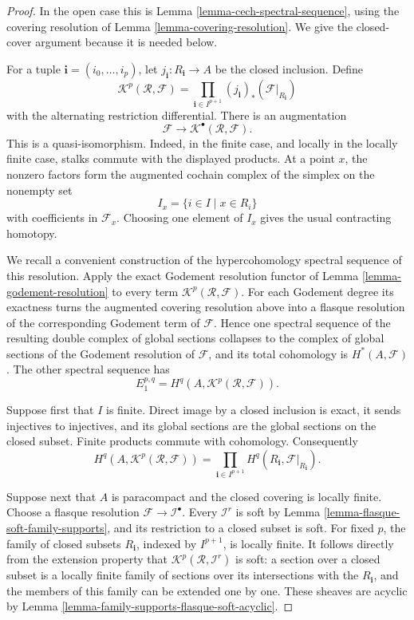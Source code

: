 \begin{proof}
In the open case this is Lemma \ref{lemma-cech-spectral-sequence}, using the
covering resolution of Lemma \ref{lemma-covering-resolution}. We give the
closed-cover argument because it is needed below.

For a tuple $\mathbf i=(i_0,\ldots,i_p)$, let
$j_{\mathbf i}:R_{\mathbf i}\to A$ be the closed inclusion. Define
$$
\mathcal K^p(\mathcal R,\mathcal F)=
\prod_{\mathbf i\in I^{p+1}}
(j_{\mathbf i})_*(\mathcal F|_{R_{\mathbf i}})
$$
with the alternating restriction differential. There is an augmentation
$$
\mathcal F\longrightarrow
\mathcal K^\bullet(\mathcal R,\mathcal F).
$$
This is a quasi-isomorphism. Indeed, in the finite case, and locally in the
locally finite case, stalks commute with the displayed products. At a point
$x$, the nonzero factors form the augmented cochain complex of the simplex
on the nonempty set
$$
I_x=\{i\in I\mid x\in R_i\}
$$
with coefficients in $\mathcal F_x$. Choosing one element of $I_x$ gives
the usual contracting homotopy.

We recall a convenient construction of the hypercohomology spectral
sequence of this resolution. Apply the exact Godement resolution functor of
Lemma \ref{lemma-godement-resolution} to every term
$\mathcal K^p(\mathcal R,\mathcal F)$. For each Godement degree its
exactness turns the augmented covering resolution above into a flasque
resolution of the corresponding Godement term of $\mathcal F$. Hence one
spectral sequence of the resulting double complex of global sections
collapses to the complex of global sections of the Godement resolution of
$\mathcal F$, and its total cohomology is $H^*(A,\mathcal F)$. The other
spectral sequence has
$$
E_1^{p,q}=H^q(A,\mathcal K^p(\mathcal R,\mathcal F)).
$$

Suppose first that $I$ is finite. Direct image by a closed inclusion is
exact, it sends injectives to injectives, and its global sections are the
global sections on the closed subset. Finite products commute with
cohomology. Consequently
$$
H^q(A,\mathcal K^p(\mathcal R,\mathcal F))=
\prod_{\mathbf i\in I^{p+1}}
H^q(R_{\mathbf i},\mathcal F|_{R_{\mathbf i}}).
$$

Suppose next that $A$ is paracompact and the closed covering is locally
finite. Choose a flasque resolution
$\mathcal F\to\mathcal I^\bullet$. Every $\mathcal I^r$ is soft by
Lemma \ref{lemma-flasque-soft-family-supports}, and its restriction to a
closed subset is soft. For fixed $p$, the family of closed subsets
$R_{\mathbf i}$, indexed by $I^{p+1}$, is locally finite. It follows
directly from the extension property that
$\mathcal K^p(\mathcal R,\mathcal I^r)$ is soft: a section over a closed
subset is a locally finite family of sections over its intersections with
the $R_{\mathbf i}$, and the members of this family can be extended one by
one. These sheaves are acyclic by Lemma
\ref{lemma-family-supports-flasque-soft-acyclic}.


\end{proof}
